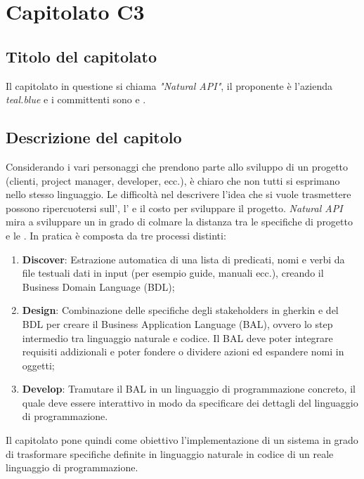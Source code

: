 \section{Capitolato C3}
\subsection{Titolo del capitolato}
Il capitolato in questione si chiama \textit{"Natural API"}, il proponente è l'azienda \textit{teal.blue} e i committenti sono \VT{} e \CR{}.

\subsection{Descrizione del capitolo}
Considerando i vari personaggi che prendono parte allo sviluppo di un progetto (clienti, project manager, developer, ecc.), è chiaro che non tutti si esprimano nello stesso linguaggio. Le difficoltà nel descrivere l'idea che si vuole trasmettere possono ripercuotersi sull', l' e il costo per sviluppare il progetto. \textit{Natural API} mira a sviluppare un  in grado di colmare la distanza tra le specifiche di progetto e le . In pratica è composta da tre processi distinti:
\begin{enumerate}
\item \textbf{Discover}: Estrazione automatica di una lista di predicati, nomi e verbi da file testuali dati in input (per esempio guide, manuali ecc.), creando il Business Domain Language (BDL);
\item \textbf{Design}: Combinazione delle specifiche degli stakeholders in gherkin e del BDL per creare il Business Application Language (BAL), ovvero lo step intermedio tra linguaggio naturale e codice. Il BAL deve poter integrare requisiti addizionali e poter fondere o dividere azioni ed espandere nomi in oggetti;
\item \textbf{Develop}: Tramutare il BAL in un linguaggio di programmazione concreto, il quale deve essere interattivo in modo da specificare dei dettagli del linguaggio di programmazione.
\end{enumerate}

Il capitolato pone quindi come obiettivo l'implementazione di un sistema in grado di trasformare specifiche definite in linguaggio naturale in codice di un reale linguaggio di programmazione.

